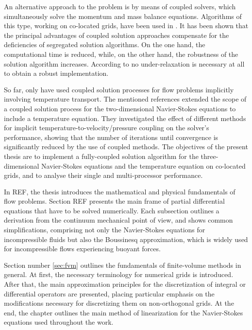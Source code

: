 An alternative approach to the problem is by means of coupled solvers, which simultaneously solve the momentum and mass balance equations. Algorithms of this type, working on co-located grids, have been used in \cite{chen10,darwish09,falk13,galpin86,klaij13,mangani14,vakilipour12}. It has been shown that the principal advantages of coupled solution approaches compensate for the deficiencies of segregated solution algorithms. On the one hand, the computational time is reduced, while, on the other hand, the robustness of the solution algorithm increases. According to \cite{darwish09} no under-relaxation is necessary at all to obtain a robust implementation.  

So far, only \cite{galpin86,vakilipour12} have used coupled solution processes for flow problems implicitly involving temperature transport. The mentioned references extended the scope of a coupled solution process for the two-dimensional Navier-Stokes equations to include a temperature equation. They investigated the effect of different methods for implicit temperature-to-velocity/pressure coupling on the solver's performance, showing that the number of iterations until convergence is significantly reduced by the use of coupled methods. The objectives of the present thesis are to implement a fully-coupled solution algorithm for the three-dimensional Navier-Stokes equations and the temperature equation on co-located grids, and to analyse their single and multi-processor performance.

In REF, the thesis introduces the mathematical and physical fundamentals of flow problems. Section REF presents the main frame of partial differential equations that have to be solved numerically. Each subsection outlines a derivation from the continuum mechanical point of view, and shows common simplifications, comprising not only the Navier-Stokes equations for incompressible fluids but also the Boussinesq approximation, which is widely used for incompressible flows experiencing buoyant forces.

Section number \ref{sec:fvm} outlines the fundamentals of finite-volume methods in general. At first, the necessary terminology for numerical grids is introduced. After that, the main approximation principles for the discretization of integral or differential operators are presented, placing particular emphasis on the modifications necessary for discretizing them on non-orthogonal grids. At the end, the chapter outlines the main method of linearization for the Navier-Stokes equations used throughout the work.

